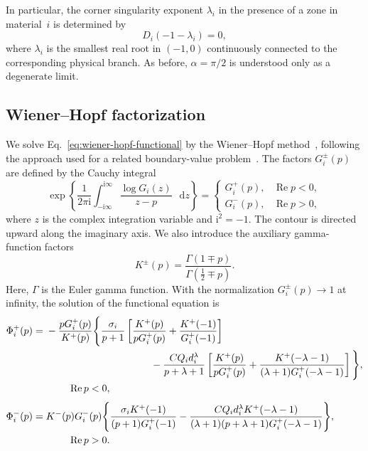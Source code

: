 \documentclass[pdflatex,onecolumn,sn-mathphys-ay]{sn-jnl}
\newcommand{\dd}{\mathop{}\!\mathrm{d}}
\newcommand{\ii}{\mathrm{i}}
\begin{document}
In particular, the corner singularity exponent $\lambda_i$ in the
presence of a zone in material~$i$ is determined by
\begin{equation*}
  D_i(-1-\lambda_i)=0,
\end{equation*}
where $\lambda_i$ is the smallest real root in $(-1,0)$ continuously
connected to the corresponding physical branch. As before,
$\alpha=\pi/2$ is understood only as a degenerate limit.

\subsection{Wiener--Hopf factorization}
\label{subsec:wiener-hopf}

We solve Eq.~\eqref{eq:wiener-hopf-functional} by the Wiener--Hopf
method~\citep{noble1958wienerhopf}, following the approach used for a related
boundary-value problem~\citep{KaminskyDudykPolishchuk2024}.
The factors $G_i^\pm(p)$ are defined by the Cauchy integral
\begin{equation*}
  \exp\left\{
    \frac{1}{2\pi\ii}
    \int_{-\ii\infty}^{\ii\infty}
      \frac{\log G_i(z)}{z-p}\,\dd z
  \right\}
  =
  \begin{cases}
    G_i^+(p), & \operatorname{Re}p<0,\\
    G_i^-(p), & \operatorname{Re}p>0,
  \end{cases}
\end{equation*}
where $z$ is the complex integration variable and $\ii^2=-1$.
The contour is directed upward along the imaginary axis. We also introduce
the auxiliary gamma-function factors
\begin{equation*}
  K^\pm(p)=
  \frac{\Gamma(1\mp p)}{\Gamma(\tfrac12\mp p)}.
\end{equation*}
Here, $\Gamma$ is the Euler gamma function.
With the normalization $G_i^\pm(p)\to1$ at infinity, the solution of
the functional equation is
\begin{equation}
\label{eq:wiener-hopf-solution}
\begin{aligned}
  \Phi_i^+(p)={}&
  -\frac{pG_i^+(p)}{K^+(p)}
  \Bigg\{
    \frac{\sigma_i}{p+1}
    \left[
      \frac{K^+(p)}{pG_i^+(p)}
      +\frac{K^+(-1)}{G_i^+(-1)}
    \right]\\
  &\hspace{37mm}
    -\frac{CQ_i d_i^\lambda}{p+\lambda+1}
    \left[
      \frac{K^+(p)}{pG_i^+(p)}
      +\frac{K^+(-\lambda-1)}
      {(\lambda+1)G_i^+(-\lambda-1)}
    \right]
  \Bigg\},\\[-1pt]
  &\hspace{8mm}\operatorname{Re}p<0,\\[3pt]
  \Phi_i^-(p)={}&
  K^-(p)G_i^-(p)
  \Bigg\{
    \frac{\sigma_iK^+(-1)}{(p+1)G_i^+(-1)}
    -\frac{CQ_i d_i^\lambda K^+(-\lambda-1)}
    {(\lambda+1)(p+\lambda+1)G_i^+(-\lambda-1)}
  \Bigg\},\\[-1pt]
  &\hspace{8mm}\operatorname{Re}p>0.
\end{aligned}
\end{equation}
\end{document}
